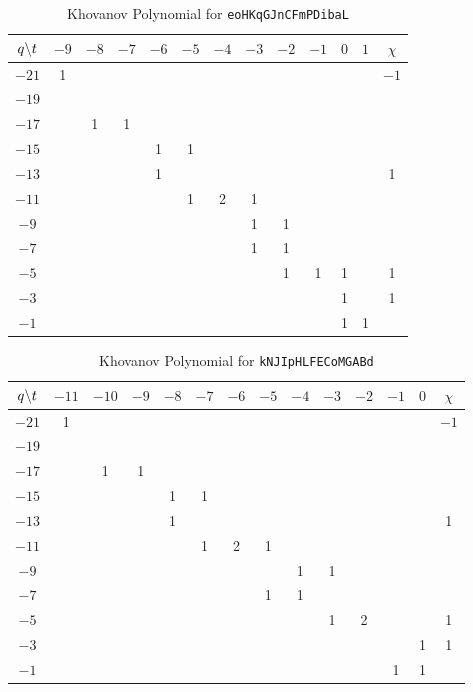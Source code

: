     \begin{table}
        \centering
        \begin{tabular}{| c | c | c | c | c | c | c | c | c | c | c | c | c |}
            \hline
            $q\symbol{92}t$&$-9$&$-8$&$-7$&$-6$&$-5$&$-4$&$-3$&$-2$&$-1$&$0$&$1$&$\chi$\\
            \hline
            $-21$&1&&&&&&&&&&&$-1$\\
            \hline
            $-19$&&&&&&&&&&&&\\
            \hline
            $-17$&&1&1&&&&&&&&&\\
            \hline
            $-15$&&&&1&1&&&&&&&\\
            \hline
            $-13$&&&&1&&&&&&&&1\\
            \hline
            $-11$&&&&&1&2&1&&&&&\\
            \hline
            $-9$&&&&&&&1&1&&&&\\
            \hline
            $-7$&&&&&&&1&1&&&&\\
            \hline
            $-5$&&&&&&&&1&1&1&&1\\
            \hline
            $-3$&&&&&&&&&&1&&1\\
            \hline
            $-1$&&&&&&&&&&1&1&\\
            \hline
        \end{tabular}
        \caption{Khovanov Polynomial for \texttt{eoHKqGJnCFmPDibaL}}
    \end{table}
    \begin{table}
        \centering
        \begin{tabular}{| c | c | c | c | c | c | c | c | c | c | c | c | c | c |}
            \hline
            $q\symbol{92}t$&$-11$&$-10$&$-9$&$-8$&$-7$&$-6$&$-5$&$-4$&$-3$&$-2$&$-1$&$0$&$\chi$\\
            \hline
            $-21$&1&&&&&&&&&&&&$-1$\\
            \hline
            $-19$&&&&&&&&&&&&&\\
            \hline
            $-17$&&1&1&&&&&&&&&&\\
            \hline
            $-15$&&&&1&1&&&&&&&&\\
            \hline
            $-13$&&&&1&&&&&&&&&1\\
            \hline
            $-11$&&&&&1&2&1&&&&&&\\
            \hline
            $-9$&&&&&&&&1&1&&&&\\
            \hline
            $-7$&&&&&&&1&1&&&&&\\
            \hline
            $-5$&&&&&&&&&1&2&&&1\\
            \hline
            $-3$&&&&&&&&&&&&1&1\\
            \hline
            $-1$&&&&&&&&&&&1&1&\\
            \hline
        \end{tabular}
        \caption{Khovanov Polynomial for \texttt{kNJIpHLFECoMGABd}}
    \end{table}
